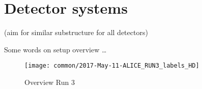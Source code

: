 \section{Detector systems}
(aim for similar substructure for all detectors)

Some words on setup overview \dots

\begin{figure}
\centering
\texttt{[image: common/2017-May-11-ALICE\_RUN3\_labels\_HD]}
\caption{Overview Run 3}
\label{fig:alice_run3}
\end{figure}












